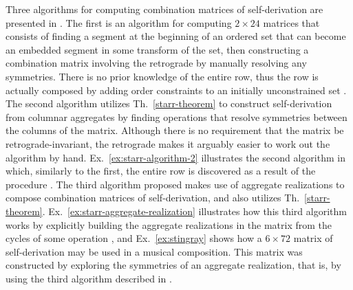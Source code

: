 Three algorithms for computing combination matrices of self-derivation are presented in \cite{Starr1984}. The first is an algorithm for computing $2 \times 24$ matrices that consists of finding a segment at the beginning of an ordered set that can become an embedded segment in some transform of the set, then constructing a combination matrix involving the retrograde by manually resolving any symmetries. There is no prior knowledge of the entire row, thus the row is actually composed by adding order constraints to an initially unconstrained set \cite[217]{Starr1984}. The second algorithm utilizes Th.~\ref{starr-theorem} to construct self-derivation from columnar aggregates by finding operations that resolve symmetries between the columns of the matrix. Although there is no requirement that the matrix be retrograde-invariant, the retrograde makes it arguably easier to work out the algorithm by hand. Ex.~\ref{ex:starr-algorithm-2} illustrates the second algorithm in which, similarly to the first, the entire row is discovered as a result of the procedure \cite[222]{Starr1984}. The third algorithm proposed makes use of aggregate realizations to compose combination matrices of self-derivation, and also utilizes Th.~\ref{starr-theorem}. Ex.~\ref{ex:starr-aggregate-realization} illustrates how this third algorithm works by explicitly building the aggregate realizations in the matrix from the cycles of some operation \cite[226, 227]{Starr1984}, and Ex.~\ref{ex:stingray} shows how a $6 \times 72$ matrix of self-derivation may be used in a musical composition. This matrix was constructed by exploring the symmetries of an aggregate realization, that is, by using the third algorithm described in \cite{Starr1984}.

